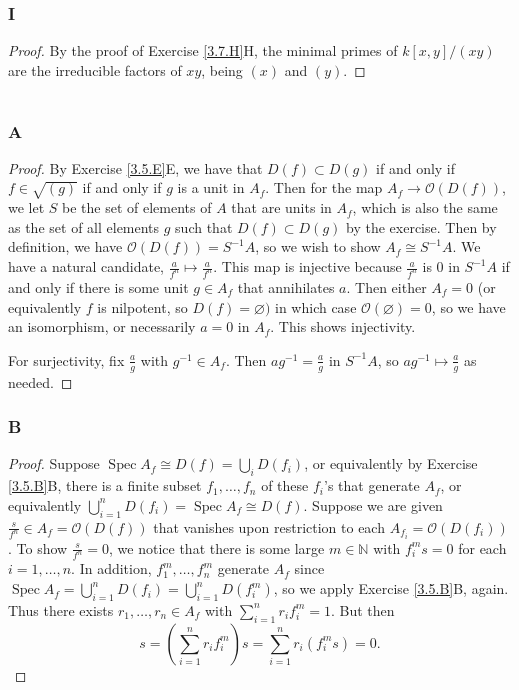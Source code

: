 \documentclass{article}
\newcommand{\N}{\mathbb{N}}
\newcommand{\fO}{\mathscr{O}}
\DeclareMathOperator{\Spec}{\mathrm{Spec}}
\let\emptyset\varnothing
\begin{document}
\subsubsection{I}\label{3.7.I}
\begin{proof}
    By the proof of Exercise \ref{3.7.H}H, the minimal primes of $k[x,y]/(xy)$ are the irreducible factors of $xy$, being $(x)$ and $(y)$.
\end{proof}

\section{}
\subsection{}
\subsubsection{A}\label{4.1.A}
\begin{proof}
    By Exercise \ref{3.5.E}E,
    we have that $D(f)\subset D(g)$ if and only if $f\in \sqrt{(g)}$ if and only if $g$ is a unit in $A_f$. Then for the map $A_f \to \fO(D(f))$, we let $S$ be the set of elements of $A$ that are units in $A_f$, which is also the same as the set of all elements $g$ such that $D(f)\subset D(g)$ by the exercise. Then by definition, we have $\fO(D(f))=S^{-1}A$, so we wish to show $A_f \cong S^{-1}A$. We have a natural candidate, $\frac{a}{f^n}\mapsto \frac{a}{f^n}$. This map is injective because $\frac{a}{f^n}$ is $0$ in $S^{-1}A$ if and only if there is some unit $g\in A_f$ that annihilates $a$. Then either $A_f = 0$ (or equivalently $f$ is nilpotent, so $D(f)=\emptyset)$ in which case $\fO(\emptyset)=0$, so we have an isomorphism, or necessarily $a=0$ in $A_f$. This shows injectivity.

    For surjectivity, fix $\frac{a}{g}$ with $g^{-1}\in A_f$. Then ${ag^{-1}} = \frac{a}{g}$ in $S^{-1}A$, so $ag^{-1}\mapsto \frac{a}{g}$ as needed.
\end{proof}
\subsubsection{B}\label{4.1.B}
\begin{proof}
    Suppose $\Spec A_f \cong D(f)=\bigcup_i D(f_i)$, or equivalently by Exercise \ref{3.5.B}B,
    there is a finite subset $f_1, \dots, f_n$ of these $f_i$'s that generate $A_f$, or equivalently $\bigcup_{i=1}^n D(f_i)=\Spec A_f\cong  D(f)$. Suppose we are given $\frac{s}{f^n}\in A_f=\fO(D(f))$ that vanishes upon restriction to each $A_{f_i}=\fO(D(f_i))$. To show $\frac{s}{f^n}=0$, we notice that there is some large $m\in \N$ with $f_i^m s =0$ for each $i=1, \dots, n$. In addition, $f_1^m, \dots, f_n^m$ generate $A_f$ since $\Spec A_f = \bigcup_{i=1}^n D(f_i) = \bigcup_{i=1}^n D(f_i^m)$, so we apply Exercise \ref{3.5.B}B, 
    again. Thus there exists $r_1, \dots, r_n \in A_f$ with $\sum_{i=1}^n r_i f_i^m =1$. But then
    \[
    s= \left( \sum_{i=1}^n r_i f_i^m\right) s=\sum_{i=1}^n r_i (f_i^m s)=0.
    \]
\end{proof}
\end{document}
